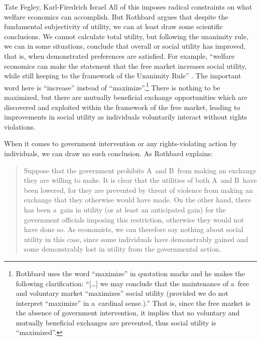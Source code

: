 \begin{artengenv2auth}{Tate Fegley, Karl-Firedrich Israel}
All of this imposes radical constraints on what welfare economics can accomplish. But Rothbard argues that despite the fundamental subjectivity of utility, we can at least draw some scientific conclusions. We cannot calculate total utility, but following the unanimity rule, we can in some situations, conclude that overall or social utility has improved, that is, when demonstrated preferences are satisfied. For example, ``welfare economics can make the statement that the free market increases social utility, while still keeping to the framework of the Unanimity Rule'' 
\parencite[][p.320]{rothbard_toward_2011}. %
 The important word here is ``increase'' instead of ``maximize''.\footnote{Rothbard 
\parencite*[][p.323]{rothbard_conceived_2011} %
 uses the word ``maximize'' in quotation marks and he makes the following clarification: ``[…] we may conclude that the maintenance of a~free and voluntary market ``maximizes'' social utility (provided we do not interpret ``maximize'' in a~cardinal sense.).'' That is, since the free market is the absence of government intervention, it implies that no voluntary and mutually beneficial exchanges are prevented, thus social utility is ``maximized''.} There is nothing to be maximized, but there are mutually beneficial exchange opportunities which are discovered and exploited within the framework of the free market, leading to improvements in social utility as individuals voluntarily interact without rights violations.



When it comes to government intervention or any rights-violating action by individuals, we can draw no such conclusion. As Rothbard 
\parencite*[][p.322]{rothbard_toward_2011} %
 explains:



\begin{quote}
Suppose that the government prohibits A~and B~from making an exchange they are willing to make. It is clear that the utilities of both A~and B~have been lowered, for they are prevented by threat of violence from making an exchange that they otherwise would have made. On the other hand, there has been a~gain in utility (or at least an anticipated gain) for the government officials imposing this restriction, otherwise they would not have done so. As economists, we can therefore say nothing about social utility in this case, since some individuals have demonstrably gained and some demonstrably lost in utility from the governmental action.
\end{quote}




\end{artengenv2auth}
